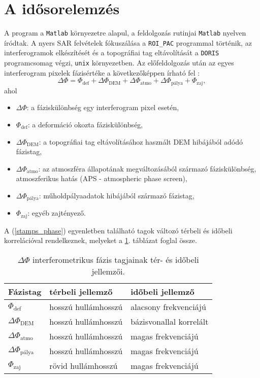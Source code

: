 \documentclass[12pt]{report}
\numberwithin{equation}{section}
\numberwithin{table}{section}
\numberwithin{figure}{section}
\begin{document}
\section{A \stamps idősorelemzés}\label{stamps}

A \stamps program a \texttt{Matlab} környezetre alapul, a \stamps feldolgozás rutinjai \texttt{Matlab} nyelven íródtak. A nyers SAR felvételek fókuszálása a \texttt{ROI\_PAC} programmal történik, az interferogramok elkészítését és a topográfiai tag eltávolítását a \texttt{DORIS} programcsomag végzi, \texttt{unix} környezetben. Az előfeldolgozás után az egyes interferogram pixelek fázisértéke a következőképpen írható fel \cite{HooperThesis}:
\begin{equation}\label{stamps_phase}
    \Delta\Phi = \Phi_{\text{def}} + \Delta\Phi_{\text{DEM}} + \Delta\Phi_{\text{atmo}} + \Delta\Phi_{\text{pálya}} + \Phi_{\text{zaj}},
\end{equation}
ahol
\begin{itemize}
    \item $\Delta\Phi$: a fáziskülönbség egy interferogram pixel esetén,
    \item $\Phi_{\text{def}}$: a deformáció okozta fáziskülönbség,
    \item $\Delta\Phi_{\text{DEM}}$: a topográfiai tag eltávolításához használt DEM hibájából adódó fázistag,
    \item $\Delta\Phi_{\text{atmo}}$: az atmoszféra állapotának megváltozásából származó fáziskülönbség, atmoszferikus hatás (APS - atmospheric phase screen),
    \item $\Delta\Phi_{\text{pálya}}$: műholdpályaadatok hibájából származó fázistag,
    \item $\Phi_{\text{zaj}}$: egyéb zajtényező.
\end{itemize}
A (\ref{stamps_phase}) egyenletben található tagok változó térbeli és időbeli korrelációval rendelkeznek, melyeket a \ref{phase_corr}. táblázat foglal össze.

\begin{table}[H]
    \centering
    \begin{tabular}{l l l} \toprule
        Fázistag & térbeli jellemző & időbeli jellemző\\ \midrule
        $\Phi_{\text{def}}$ & hosszú hullámhosszú & alacsony frekvenciájú\\
        $\Delta\Phi_{\text{DEM}}$ & hosszú hullámhosszú & bázisvonallal korrelált \\
        $\Delta\Phi_{\text{atmo}}$ & hosszú hullámhosszú & magas frekvenciájú\\
        $\Delta\Phi_{\text{pálya}}$ & hosszú hullámhosszú & magas frekvenciájú \\
        $\Phi_{\text{zaj}}$ & rövid hullámhosszú & magas frekvenciájú \\ \bottomrule
    \end{tabular}
    \caption{$\Delta\Phi$ interferometrikus fázis tagjainak tér- és időbeli jellemzői. \cite{Hooper2012}}\label{phase_corr}
\end{table}
\end{document}

